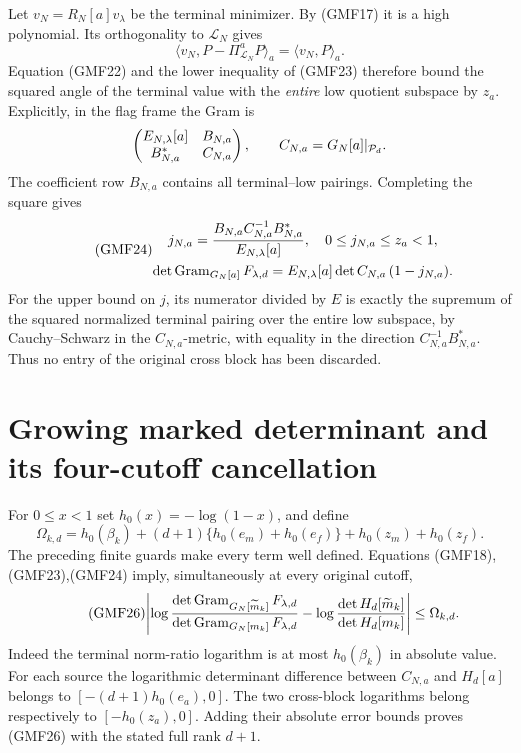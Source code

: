 Let \(v_N=R_N[a]v_\lambda\) be the terminal minimizer.
By (GMF17) it is a high polynomial.  Its orthogonality to
\(\mathcal L_N\) gives
\[
 \langle v_N,P-\Pi_{\mathcal L_N}^aP\rangle_a
                       =\langle v_N,P\rangle_a.
\]
Equation (GMF22) and the lower inequality of (GMF23)
therefore bound the squared angle of the terminal value
with the \emph{entire} low quotient subspace by \(z_a\).
Explicitly, in the flag frame the Gram is
\[
 \begin{pmatrix} E_{N,\lambda}[a]&B_{N,a}\\
                 B_{N,a}^*&C_{N,a}\end{pmatrix},\qquad
 C_{N,a}=G_N[a]|_{\mathcal P_d}.
\]
The coefficient row \(B_{N,a}\) contains all terminal--low
pairings.  Completing the square gives
\begin{equation}\tag{GMF24}
\begin{gathered}
 j_{N,a}=
 \frac{B_{N,a}C_{N,a}^{-1}B_{N,a}^*}{E_{N,\lambda}[a]},
 \quad 0\le j_{N,a}\le z_a<1,\\
 \det\operatorname{Gram}_{G_N[a]}F_{\lambda,d}
 =E_{N,\lambda}[a]\det C_{N,a}\,(1-j_{N,a}).
\end{gathered}
\end{equation}
For the upper bound on \(j\), its numerator divided by \(E\)
is exactly the supremum of the squared normalized terminal
pairing over the entire low subspace, by Cauchy--Schwarz
in the \(C_{N,a}\)-metric, with equality in the direction
\(C_{N,a}^{-1}B_{N,a}^*\).
Thus no entry of the original cross block has been discarded.

\section{Growing marked determinant and its four-cutoff cancellation}

For \(0\le x<1\) set \(h_0(x)=-\log(1-x)\), and define
\begin{equation}\tag{GMF25}
 \Omega_{k,d}=
 h_0(\beta_k)
 +(d+1)\{h_0(e_m)+h_0(e_f)\}
 +h_0(z_m)+h_0(z_f).
\end{equation}
The preceding finite guards make every term well defined.
Equations (GMF18),(GMF23),(GMF24) imply, simultaneously at
every original cutoff,
\begin{equation}\tag{GMF26}
\begin{split}
 \left|
 \log\frac{\det\operatorname{Gram}_{G_N[\widetilde m_k]}F_{\lambda,d}}
              {\det\operatorname{Gram}_{G_N[m_k]}F_{\lambda,d}}
 -\log\frac{\det H_d[\widetilde m_k]}{\det H_d[m_k]}
 \right|\le\Omega_{k,d}.
\end{split}
\end{equation}
Indeed the terminal norm-ratio logarithm is at most
\(h_0(\beta_k)\) in absolute value.
For each source the logarithmic determinant difference
between \(C_{N,a}\) and \(H_d[a]\) belongs to
\([-(d+1)h_0(e_a),0]\).
The two cross-block logarithms belong respectively to
\([-h_0(z_a),0]\).
Adding their absolute error bounds proves (GMF26) with
the stated full rank \(d+1\).

